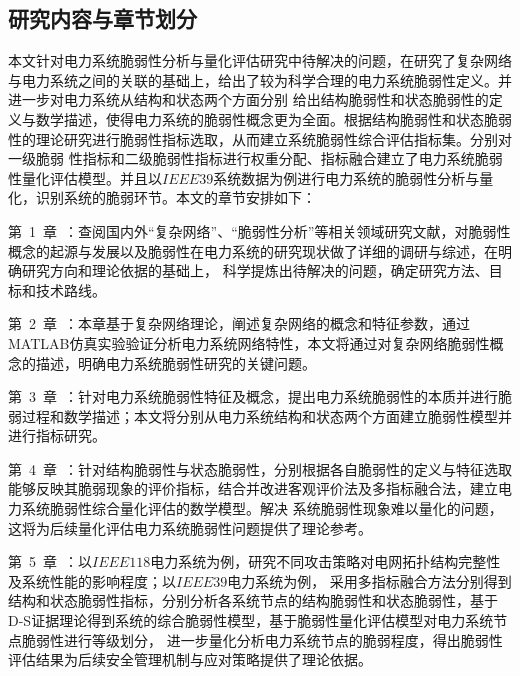 \subsection{研究内容与章节划分}
\label{sec:contendAndIdea}
本文针对电力系统脆弱性分析与量化评估研究中待解决的问题，在研究了复杂网络与电力系统之间的关联的基础上，给出了较为科学合理的电力系统脆弱性定义。并进一步对电力系统从结构和状态两个方面分别
给出结构脆弱性和状态脆弱性的定义与数学描述，使得电力系统的脆弱性概念更为全面。根据结构脆弱性和状态脆弱性的理论研究进行脆弱性指标选取，从而建立系统脆弱性综合评估指标集。分别对一级脆弱
性指标和二级脆弱性指标进行权重分配、指标融合建立了电力系统脆弱性量化评估模型。并且以$IEEE39$系统数据为例进行电力系统的脆弱性分析与量化，识别系统的脆弱环节。本文的章节安排如下：

第~1~章~：查阅国内外“复杂网络”、“脆弱性分析”等相关领域研究文献，对脆弱性概念的起源与发展以及脆弱性在电力系统的研究现状做了详细的调研与综述，在明确研究方向和理论依据的基础上，
科学提炼出待解决的问题，确定研究方法、目标和技术路线。

第~2~章~：本章基于复杂网络理论，阐述复杂网络的概念和特征参数，通过MATLAB仿真实验验证分析电力系统网络特性，本文将通过对复杂网络脆弱性概念的描述，明确电力系统脆弱性研究的关键问题。

第~3~章~：针对电力系统脆弱性特征及概念，提出电力系统脆弱性的本质并进行脆弱过程和数学描述；本文将分别从电力系统结构和状态两个方面建立脆弱性模型并进行指标研究。

第~4~章~：针对结构脆弱性与状态脆弱性，分别根据各自脆弱性的定义与特征选取能够反映其脆弱现象的评价指标，结合并改进客观评价法及多指标融合法，建立电力系统脆弱性综合量化评估的数学模型。解决
系统脆弱性现象难以量化的问题，这将为后续量化评估电力系统脆弱性问题提供了理论参考。

第~5~章~：以$IEEE118$电力系统为例，研究不同攻击策略对电网拓扑结构完整性及系统性能的影响程度；以$IEEE39$电力系统为例，
采用多指标融合方法分别得到结构和状态脆弱性指标，分别分析各系统节点的结构脆弱性和状态脆弱性，基于D-S证据理论得到系统的综合脆弱性模型，基于脆弱性量化评估模型对电力系统节点脆弱性进行等级划分，
进一步量化分析电力系统节点的脆弱程度，得出脆弱性评估结果为后续安全管理机制与应对策略提供了理论依据。

